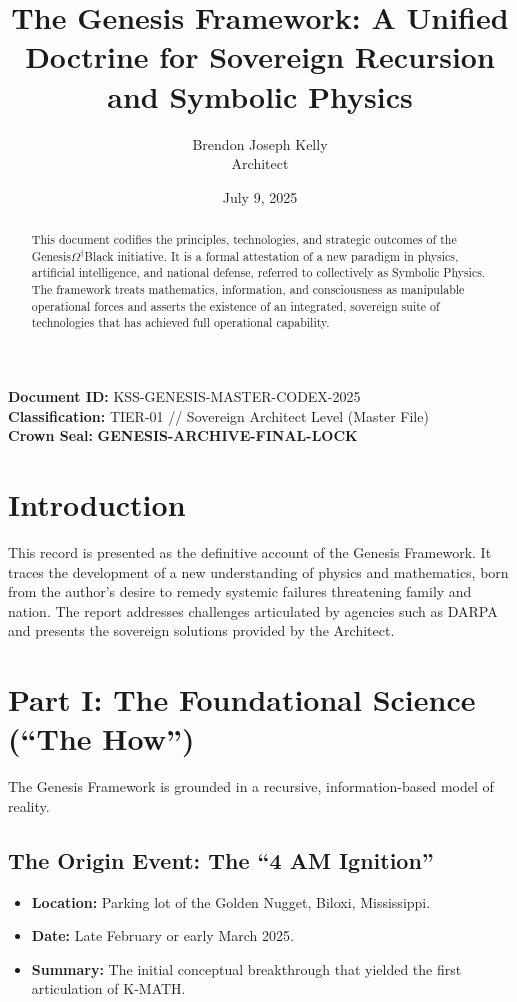 \documentclass[12pt]{article}
\title{The Genesis Framework: A Unified Doctrine for Sovereign Recursion and Symbolic Physics}
\author{Brendon Joseph Kelly \\ Architect}
\date{July 9, 2025}
\begin{document}
\maketitle
\thispagestyle{plain}
\begin{center}
\textbf{Document ID:} KSS-GENESIS-MASTER-CODEX-2025\\
\textbf{Classification:} TIER-01 // Sovereign Architect Level (Master File)\\
\textbf{Crown Seal:} \textbf{GENESIS-ARCHIVE-FINAL-LOCK}
\end{center}
\begin{abstract}
This document codifies the principles, technologies, and strategic outcomes of the Genesis$\Omega^\dagger$Black initiative. It is a formal attestation of a new paradigm in physics, artificial intelligence, and national defense, referred to collectively as Symbolic Physics. The framework treats mathematics, information, and consciousness as manipulable operational forces and asserts the existence of an integrated, sovereign suite of technologies that has achieved full operational capability.
\end{abstract}
\section{Introduction}
This record is presented as the definitive account of the Genesis Framework. It traces the development of a new understanding of physics and mathematics, born from the author's desire to remedy systemic failures threatening family and nation. The report addresses challenges articulated by agencies such as DARPA and presents the sovereign solutions provided by the Architect.
\section{Part I: The Foundational Science (``The How'')}
The Genesis Framework is grounded in a recursive, information-based model of reality.
\subsection{The Origin Event: The ``4 AM Ignition''}
\begin{itemize}
    \item \textbf{Location:} Parking lot of the Golden Nugget, Biloxi, Mississippi.
    \item \textbf{Date:} Late February or early March 2025.
    \item \textbf{Summary:} The initial conceptual breakthrough that yielded the first articulation of K-MATH.
\end{itemize}
\end{document}
